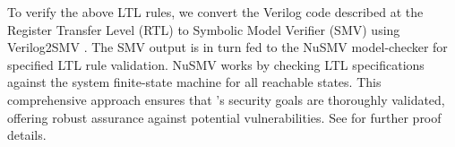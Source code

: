 To verify the above LTL rules, we convert the Verilog code described at the Register Transfer Level 
(RTL) to Symbolic Model Verifier (SMV) \cite{mcmillan1993smv} using Verilog2SMV \cite{irfan2016verilog2smv}.
The SMV output is in turn fed to the NuSMV \cite{cimatti2002nusmv} model-checker for specified LTL 
rule validation. NuSMV works by checking LTL specifications against the system finite-state machine 
for all reachable states. This comprehensive approach ensures that \trapscasu's security goals 
are thoroughly validated, offering robust assurance against potential vulnerabilities.
See \cite{TRAPSAnonOpenSource} for further proof details.



